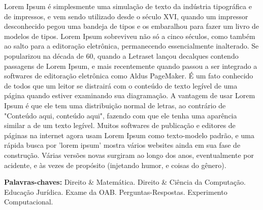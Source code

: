 
Lorem Ipsum é simplesmente uma simulação de texto da indústria tipográfica e de impressos, e vem sendo utilizado desde o século XVI, quando um impressor desconhecido pegou uma bandeja de tipos e os embaralhou para fazer um livro de modelos de tipos. Lorem Ipsum sobreviveu não só a cinco séculos, como também ao salto para a editoração eletrônica, permanecendo essencialmente inalterado. Se popularizou na década de 60, quando a Letraset lançou decalques contendo passagens de Lorem Ipsum, e mais recentemente quando passou a ser integrado a softwares de editoração eletrônica como Aldus PageMaker.
É um fato conhecido de todos que um leitor se distrairá com o conteúdo de texto legível de uma página quando estiver examinando sua diagramação. A vantagem de usar Lorem Ipsum é que ele tem uma distribuição normal de letras, ao contrário de "Conteúdo aqui, conteúdo aqui", fazendo com que ele tenha uma aparência similar a de um texto legível. Muitos softwares de publicação e editores de páginas na internet agora usam Lorem Ipsum como texto-modelo padrão, e uma rápida busca por 'lorem ipsum' mostra vários websites ainda em sua fase de construção. Várias versões novas surgiram ao longo dos anos, eventualmente por acidente, e às vezes de propósito (injetando humor, e coisas do gênero).

 \textbf{Palavras-chaves:} Direito \& Matemática. Direito \& Ciência da Computação. Educação Jurídica. Exame da OAB. Perguntas-Respostas. Experimento Computacional.
